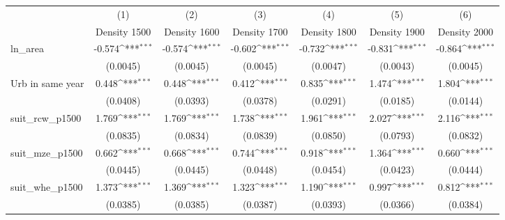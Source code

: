 {
\def\sym#1{\ifmmode^{#1}\else\(^{#1}\)\fi}
\begin{tabular}{l*{6}{c}}
\toprule
                    &\multicolumn{1}{c}{(1)}&\multicolumn{1}{c}{(2)}&\multicolumn{1}{c}{(3)}&\multicolumn{1}{c}{(4)}&\multicolumn{1}{c}{(5)}&\multicolumn{1}{c}{(6)}\\
                    &\multicolumn{1}{c}{Density 1500}&\multicolumn{1}{c}{Density 1600}&\multicolumn{1}{c}{Density 1700}&\multicolumn{1}{c}{Density 1800}&\multicolumn{1}{c}{Density 1900}&\multicolumn{1}{c}{Density 2000}\\
\midrule
ln\_area             &      -0.574\sym{***}&      -0.574\sym{***}&      -0.602\sym{***}&      -0.732\sym{***}&      -0.831\sym{***}&      -0.864\sym{***}\\
                    &    (0.0045)         &    (0.0045)         &    (0.0045)         &    (0.0047)         &    (0.0043)         &    (0.0045)         \\
\addlinespace
Urb in same year    &       0.448\sym{***}&       0.448\sym{***}&       0.412\sym{***}&       0.835\sym{***}&       1.474\sym{***}&       1.804\sym{***}\\
                    &    (0.0408)         &    (0.0393)         &    (0.0378)         &    (0.0291)         &    (0.0185)         &    (0.0144)         \\
\addlinespace
suit\_rcw\_p1500      &       1.769\sym{***}&       1.769\sym{***}&       1.738\sym{***}&       1.961\sym{***}&       2.027\sym{***}&       2.116\sym{***}\\
                    &    (0.0835)         &    (0.0834)         &    (0.0839)         &    (0.0850)         &    (0.0793)         &    (0.0832)         \\
\addlinespace
suit\_mze\_p1500      &       0.662\sym{***}&       0.668\sym{***}&       0.744\sym{***}&       0.918\sym{***}&       1.364\sym{***}&       0.660\sym{***}\\
                    &    (0.0445)         &    (0.0445)         &    (0.0448)         &    (0.0454)         &    (0.0423)         &    (0.0444)         \\
\addlinespace
suit\_whe\_p1500      &       1.373\sym{***}&       1.369\sym{***}&       1.323\sym{***}&       1.190\sym{***}&       0.997\sym{***}&       0.812\sym{***}\\
                    &    (0.0385)         &    (0.0385)         &    (0.0387)         &    (0.0393)         &    (0.0366)         &    (0.0384)         \\

\end{tabular}}
